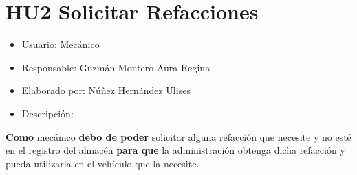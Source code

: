 \section{HU2 Solicitar Refacciones}
\begin{itemize}
	\item Usuario: Mecánico
	\item Responsable: Guzmán Montero Aura Regina
	\item Elaborado por: Núñez Hernández Ulises
	\item Descripción:\\
\end{itemize}

\textbf{Como} mecánico \textbf{debo de poder} solicitar alguna refacción que necesite y no esté en el registro del almacén \textbf{para que} la administración obtenga dicha refacción y pueda utilizarla en el vehículo que la necesite. 